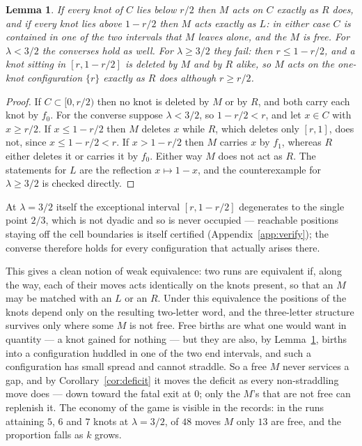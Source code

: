 \documentclass[11pt,reqno]{amsart}
\theoremstyle{plain}
\newtheorem{lemma}[theorem]{Lemma}
\theoremstyle{definition}
\theoremstyle{remark}
\begin{document}
\begin{lemma}\label{lem:free}
If every knot of $C$ lies below $r/2$ then $M$ acts on $C$ exactly as $R$
does, and if every knot lies above $1-r/2$ then $M$ acts exactly as $L$: in
either case $C$ is contained in one of the two intervals that $M$ leaves
alone, and the $M$ is free. For $\lambda<3/2$ the converses hold as well. For
$\lambda\geq3/2$ they fail: then $r\leq1-r/2$, and a knot sitting in
$[r,1-r/2]$ is deleted by $M$ and by $R$ alike, so $M$ acts on the
one-knot configuration $\{r\}$ exactly as $R$ does although $r\geq r/2$.
\end{lemma}

\begin{proof}
If $C\subset[0,r/2)$ then no knot is deleted by $M$ or by $R$, and both carry
each knot by $f_0$. For the converse suppose $\lambda<3/2$, so $1-r/2<r$, and
let $x\in C$ with $x\geq r/2$. If $x\leq1-r/2$ then $M$ deletes $x$ while $R$,
which deletes only $[r,1]$, does not, since $x\leq1-r/2<r$. If $x>1-r/2$ then
$M$ carries $x$ by $f_1$, whereas $R$ either deletes it or carries it by
$f_0$. Either way $M$ does not act as $R$. The statements for $L$ are the
reflection $x\mapsto1-x$, and the counterexample for $\lambda\geq3/2$ is
checked directly.
\end{proof}

At $\lambda=3/2$ itself the exceptional interval $[r,1-r/2]$ degenerates to the
single point $2/3$, which is not dyadic and so is never occupied --- reachable
positions staying off the cell boundaries is itself certified
(Appendix~\ref{app:verify}); the converse therefore holds for every
configuration that actually arises there.

This gives a clean notion of weak equivalence: two runs are equivalent if,
along the way, each of their moves acts identically on the knots present, so
that an $M$ may be matched with an $L$ or an $R$. Under this equivalence the
positions of the knots depend only on the resulting two-letter word, and the
three-letter structure survives only where some $M$ is not free. Free births
are what one would want in quantity --- a knot gained for nothing --- but they
are also, by Lemma~\ref{lem:free}, births into a configuration huddled in one
of the two end intervals, and such a configuration has small spread and cannot
straddle. So a free $M$ never services a gap, and by Corollary~\ref{cor:deficit} it
moves the deficit as every non-straddling move does --- down toward the fatal
exit at $0$; only the $M$'s that are not free can replenish it. The
economy of the game is visible in the records: in the runs attaining $5$, $6$
and $7$ knots at $\lambda=3/2$, of $48$ moves $M$ only $13$ are free, and the
proportion falls as $k$ grows.
\end{document}
